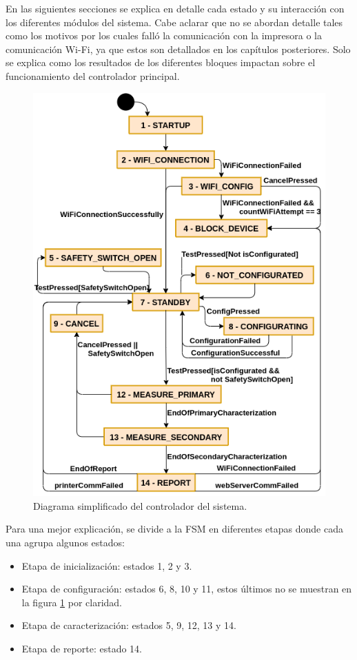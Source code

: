En las siguientes secciones se explica en detalle cada estado y su interacción con los diferentes módulos del sistema. Cabe aclarar que no se abordan detalle tales como los motivos por los cuales falló la comunicación con la impresora o la comunicación Wi-Fi, ya que estos son detallados en los capítulos posteriores. Solo se explica como los resultados de los diferentes bloques impactan sobre el funcionamiento del controlador principal.
\pagebreak
\begin{figure}[ht]
	\centering
	\includegraphics[scale=1]{./Figures/MainFSM_red.png}
	\caption{Diagrama simplificado del controlador del sistema.}
	\label{fig:MainFSM_red}
\end{figure}

Para una mejor explicación, se divide a la FSM en diferentes etapas donde cada una agrupa algunos estados:
\begin{itemize}
\item Etapa de inicialización: estados 1, 2 y 3.
\item Etapa de configuración: estados 6, 8, 10 y 11, estos últimos no se muestran en la figura \ref{fig:MainFSM_red} por claridad.
\item Etapa de caracterización: estados 5, 9, 12, 13 y 14. 
\item Etapa de reporte: estado 14.
\end{itemize}


